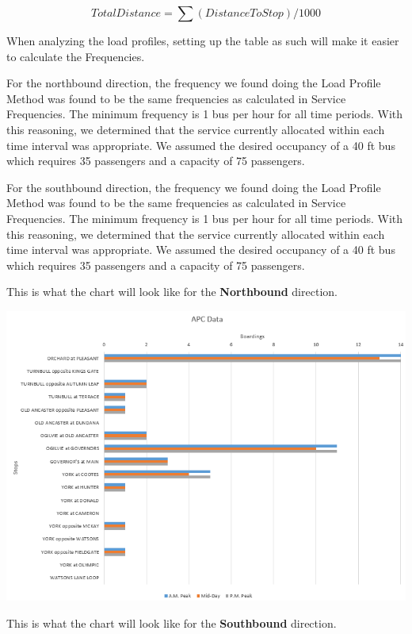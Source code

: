\documentclass[
11pt, %
oneside, %
english, %
singlespacing, %
]{macthesis} %
\begin{document}
\[
Total Distance = \sum (Distance To  Stop)/1000
\]

When analyzing the load profiles, setting up the table as such will make it easier to calculate the Frequencies.

For the northbound direction, the frequency we found doing the Load Profile Method was found to be the same frequencies as calculated in Service Frequencies. The minimum frequency is 1 bus per hour for all time periods. With this reasoning, we determined that the service currently allocated within each time interval was appropriate. We assumed the desired occupancy of a 40 ft bus which requires 35 passengers and a capacity of 75 passengers.

For the southbound direction, the frequency we found doing the Load Profile Method was found to be the same frequencies as calculated in Service Frequencies. The minimum frequency is 1 bus per hour for all time periods. With this reasoning, we determined that the service currently allocated within each time interval was appropriate. We assumed the desired occupancy of a 40 ft bus which requires 35 passengers and a capacity of 75 passengers.

This is what the chart will look like for the \textbf{Northbound} direction.

\includegraphics[width=1\linewidth]{figure/Load_Profile_Northbound}

This is what the chart will look like for the \textbf{Southbound} direction.
\end{document}
